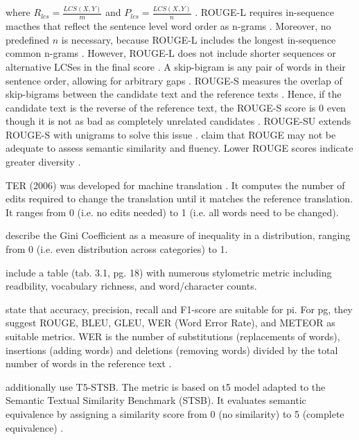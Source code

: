where $R_{lcs} = \frac{LCS(X,Y)}{m}$ and $P_{lcs} = \frac{LCS(X,Y)}{n}$ \cite{lin_rouge_2004}.
ROUGE-L requires in-sequence macthes that reflect the sentence level word order as n-grams \cite{lin_rouge_2004}.
Moreover, no predefined $n$ is necessary, because ROUGE-L includes the longest in-sequence common n-grams \cite{lin_rouge_2004}.
However, ROUGE-L does not include shorter sequences or alternative LCSes in the final score \cite{lin_rouge_2004}.
A skip-bigram is any pair of words in their sentence order, allowing for arbitrary gaps \cite{lin_rouge_2004}.
ROUGE-S measures the overlap of skip-bigrams between the candidate text and the reference texts \cite{lin_rouge_2004}.
Hence, if the candidate text is the reverse of the reference text, the ROUGE-S score is 0 even though it is not as bad as completely unrelated candidates \cite{lin_rouge_2004}.
ROUGE-SU extends ROUGE-S with unigrams to solve this issue \cite{lin_rouge_2004}.
\citet{kurt_pehlivanoglu_comparative_2024} claim that ROUGE may not be adequate to assess semantic similarity and fluency.
Lower ROUGE scores indicate greater diversity \cite{kurt_pehlivanoglu_comparative_2024}.

TER (2006) was developed for machine translation \cite{zhou_paraphrase_2021}.
It computes the number of edits required to change the translation until it matches the reference translation.
It ranges from 0 (i.e. no edits needed) to 1 (i.e. all words need to be changed).

\citet{fu_learning_2024} describe the Gini Coefficient as a measure of inequality in a distribution, ranging from 0 (i.e. even distribution across categories) to 1.

\citet{master_thesis_paraphrasing_2024} include a table (tab. 3.1, pg. 18) with numerous stylometric metric including readbility, vocabulary richness, and word/character counts.

\citet{palivela_optimization_2021} state that accuracy, precision, recall and F1-score are suitable for \ac{pi}.
For \ac{pg}, they suggest ROUGE, BLEU, GLEU, WER (Word Error Rate), and METEOR as suitable metrics.
WER is the number of substitutions (replacements of words), insertions (adding words) and deletions (removing words) 
divided by the total number of words in the reference text \cite{palivela_optimization_2021}.

\citet{kurt_pehlivanoglu_comparative_2024} additionally use T5-STSB.
The metric is based on \ac{t5} model adapted to the Semantic Textual Similarity Benchmark (STSB).
It evaluates semantic equivalence by assigning a similarity score from 0 (no similarity) to 5 (complete equivalence) \cite{kurt_pehlivanoglu_comparative_2024}.

